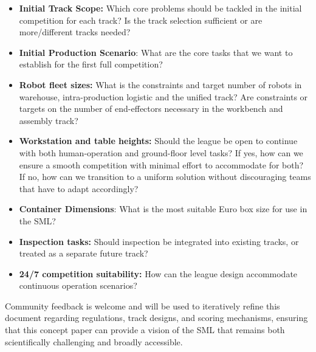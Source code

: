 \documentclass[letterpaper, 11pt]{extarticle}
\begin{document}
\begin{itemize}
    \item \textbf{Initial Track Scope:} Which core problems should be tackled in the initial competition for each track? Is the track selection sufficient or are more/different tracks needed?
    \item \textbf{Initial Production Scenario}: What are the core tasks that we want to establish for the first full competition?
    \item \textbf{Robot fleet sizes:} What is the constraints and target number of robots in warehouse, intra-production logistic and the unified track? Are constraints or targets on the number of end-effectors necessary in the workbench and assembly track?
    \item \textbf{Workstation and table heights:} Should the league be open to continue with both human-operation and ground-floor level tasks? If yes, how can we ensure a smooth competition with minimal effort to accommodate for both? If no, how can we transition to a uniform solution without discouraging teams that have to adapt accordingly?
    \item \textbf{Container Dimensions}: What is the most suitable Euro box size for use in the SML?
    \item \textbf{Inspection tasks:} Should inspection be integrated into existing tracks, or treated as a separate future track?
    
    \item \textbf{24/7 competition suitability:} How can the league design accommodate continuous operation scenarios?
    
\end{itemize}

Community feedback is welcome and will be used to iteratively refine this document regarding regulations, track designs, and scoring mechanisms, ensuring that this concept paper can provide a vision of the SML that remains both scientifically challenging and broadly accessible.




\FloatBarrier





\end{document}
